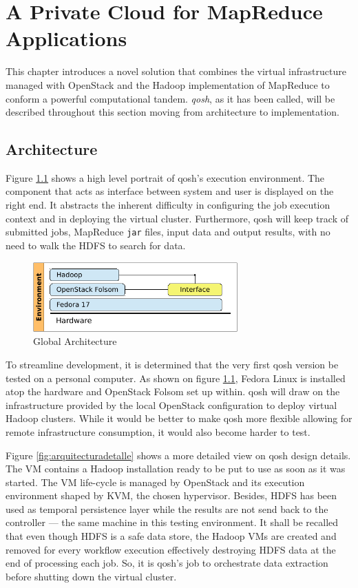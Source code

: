 \chapter{A Private Cloud for MapReduce Applications}\label{cap:solucion}
\noindent This chapter introduces a novel solution that combines the virtual infrastructure managed with OpenStack and the Hadoop implementation of MapReduce to conform a powerful computational tandem. \emph{qosh}, as it has been called, will be described throughout this section moving from architecture to implementation.

\section{Architecture}\label{sec:diseno}
\noindent Figure \ref{fig:arquitecturaglobal} shows a high level portrait of qosh's execution environment. The component that acts as interface between system and user is displayed on the right end. It abstracts the inherent difficulty in configuring the job execution context and in deploying the virtual cluster. Furthermore, qosh will keep track of submitted jobs, MapReduce \texttt{jar} files, input data and output results, with no need to walk the HDFS to search for data.

\begin{figure}[tbp]
\begin{center}
\includegraphics[width=0.7\textwidth]{imagenes/021.pdf}
 \caption{Global Architecture}
\label{fig:arquitecturaglobal}
\end{center}
\end{figure}

To streamline development, it is determined that the very first qosh version be tested on a personal computer. As shown on figure \ref{fig:arquitecturaglobal}, Fedora Linux is installed atop the hardware and OpenStack Folsom set up within. qosh will draw on the infrastructure provided by the local OpenStack configuration to deploy virtual Hadoop clusters. While it would be better to make qosh more flexible allowing for remote infrastructure consumption, it would also become harder to test.

Figure \ref{fig:arquitecturadetalle} shows a more detailed view on qosh design details. The VM contains a Hadoop installation ready to be put to use as soon as it was started. The VM life-cycle is managed by OpenStack and its execution environment shaped by KVM, the chosen hypervisor. Besides, HDFS has been used as temporal persistence layer while the results are not send back to the controller --- the same machine in this testing environment. It shall be recalled that even though HDFS is a safe data store, the Hadoop VMs are created and removed for every workflow execution effectively destroying HDFS data at the end of processing each job. So, it is qosh's job to orchestrate data extraction before shutting down the virtual cluster.

